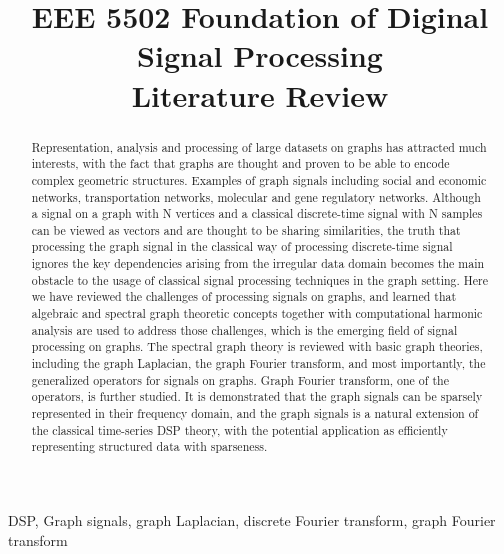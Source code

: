 \documentclass[conference]{IEEEtran}
\begin{document}
\title{EEE 5502 Foundation of Diginal Signal Processing\\ Literature Review\\
}

\author{
}

\maketitle

\begin{abstract}
Representation, analysis and processing of large datasets on graphs has attracted much interests, with the fact that graphs are thought and proven to be able to encode complex geometric structures. Examples of graph signals including social and economic networks, transportation networks, molecular and gene regulatory networks. Although a signal on a graph with N vertices and a classical discrete-time signal with N samples can be viewed as vectors and are thought to be sharing similarities, the truth that processing the graph signal in the classical way of processing discrete-time signal ignores the key dependencies arising from the irregular data domain becomes the main obstacle to the usage of classical signal processing techniques in the graph setting. Here we have reviewed the challenges of processing signals on graphs, and learned that algebraic and spectral graph theoretic concepts together with computational harmonic analysis are used to address those challenges, which is the emerging field of signal processing on graphs. The spectral graph theory is reviewed with basic graph theories, including the graph Laplacian, the graph Fourier transform, and most importantly, the generalized operators for signals on graphs. Graph Fourier transform, one of the operators, is further studied. It is demonstrated that the graph signals can be sparsely represented in their frequency domain, and the graph signals is a natural extension of the classical time-series DSP theory, with the potential application as efficiently representing structured data with sparseness. 
\end{abstract}

\begin{IEEEkeywords}
DSP, Graph signals, graph Laplacian, discrete Fourier transform, graph Fourier transform
\end{IEEEkeywords}
\end{document}
